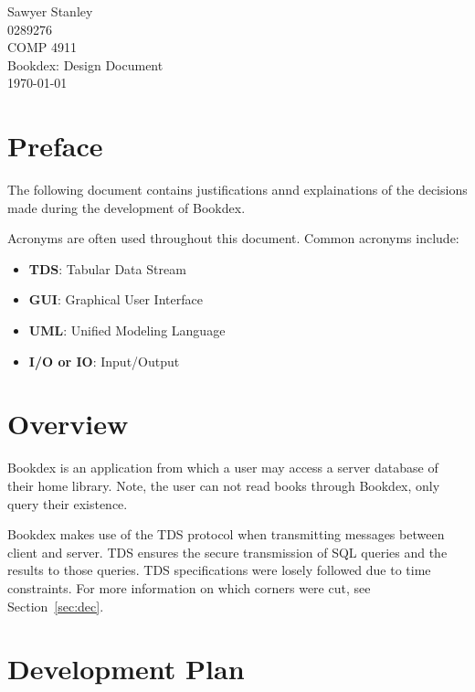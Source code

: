 \documentclass{article}
\newcommand{\class}{COMP 4911}
\newcommand{\examnum}{Bookdex: Design Document}
\newcommand{\examdate}{\today}
\newcommand{\yourname}{Sawyer Stanley}
\newcommand{\studentid}{0289276}
\begin{document}
\pagestyle{plain}

\vspace*{\fill}
\begin{center}
    \yourname\\
    \studentid\\
    \class\\
    \examnum\\
    \examdate\\
\end{center}
\vspace*{\fill}

\thispagestyle{empty}
\newpage

\tableofcontents
\newpage

\section{Preface}\label{sec:preface}
The following document contains justifications annd explainations of the decisions made during the development of Bookdex.

Acronyms are often used throughout this document. Common acronyms include:

\begin{itemize}
    \item \textbf{TDS}: Tabular Data Stream
    \item \textbf{GUI}: Graphical User Interface
    \item \textbf{UML}: Unified Modeling Language
    \item \textbf{I/O or IO}: Input/Output
\end{itemize}

\section{Overview}\label{sec:overview}
    Bookdex is an application from which a user may access a server database of their home library. Note, the user can not read books through Bookdex, only query their existence.

    Bookdex makes use of the TDS protocol when transmitting messages between client and server. TDS ensures the secure transmission of SQL queries and the results to those queries. TDS specifications were losely followed due to time constraints. For more information on which corners were cut, see Section~\ref{sec:dec}.

\section{Development Plan}\label{sec:plan}
\end{document}
